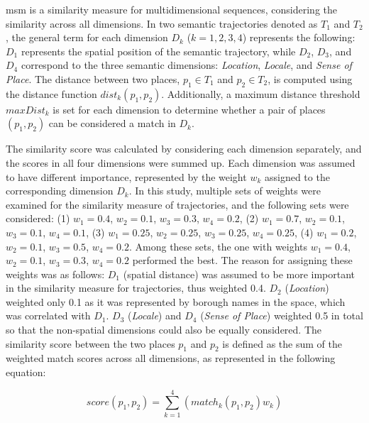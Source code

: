 \documentclass{article}
\theoremstyle{remark}
\begin{document}
\acrshort{msm} is a similarity measure for multidimensional sequences, considering the similarity across all dimensions. In two semantic trajectories denoted as $T_{1}$ and $T_{2}$, the general term for each dimension $D_{k}$ ($k = 1, 2, 3, 4$) represents the following: $D_{1}$ represents the spatial position of the semantic trajectory, while $D_{2}$, $D_{3}$, and $D_{4}$ correspond to the three semantic dimensions: \textit{Location}, \textit{Locale}, and \textit{Sense of Place}. The distance between two places, $p_{1} \in T_{1}$ and $p_{2} \in T_{2}$, is computed using the distance function $dist_{k}(p_{1},p_{2})$. Additionally, a maximum distance threshold $maxDist_{k}$ is set for each dimension to determine whether a pair of places $(p_{1},p_{2})$ can be considered a match in $D_{k}$.

The similarity score was calculated by considering each dimension separately, and the scores in all four dimensions were summed up. Each dimension was assumed to have different importance, represented by the weight $w_{k}$ assigned to the corresponding dimension $D_{k}$. In this study, multiple sets of weights were examined for the similarity measure of trajectories, and the following sets were considered: (1) $w_{1}=0.4$, $w_{2}=0.1$, $w_{3}=0.3$, $w_{4}=0.2$, (2) $w_{1}=0.7$, $w_{2}=0.1$, $w_{3}=0.1$, $w_{4}=0.1$, (3) $w_{1}=0.25$, $w_{2}=0.25$, $w_{3}=0.25$, $w_{4}=0.25$, (4) $w_{1}=0.2$, $w_{2}=0.1$, $w_{3}=0.5$, $w_{4}=0.2$. Among these sets, the one with weights $w_{1}=0.4$, $w_{2}=0.1$, $w_{3}=0.3$, $w_{4}=0.2$ performed the best. The reason for assigning these weights was as follows: $D_{1}$ (spatial distance) was assumed to be more important in the similarity measure for trajectories, thus weighted 0.4. $D_{2}$ (\textit{Location}) weighted only 0.1 as it was represented by borough names in the space, which was correlated with $D_{1}$. $D_{3}$ (\textit{Locale}) and $D_{4}$ (\textit{Sense of Place}) weighted 0.5 in total so that the non-spatial dimensions could also be equally considered. The similarity score between the two places $p_{1}$ and $p_{2}$ is defined as the sum of the weighted match scores across all dimensions, as represented in the following equation:

\begin{equation} \label{eq:match_score}
    score(p_{1},p_{2}) = \sum_{k=1}^{4}(match_{k}(p_{1},p_{2})w_{k})
\end{equation}
\end{document}
